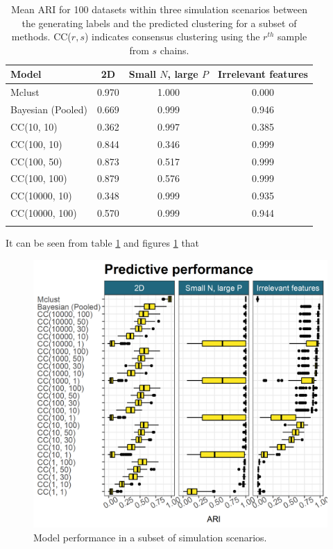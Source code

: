 \documentclass{bioinfo}
\begin{document}
\begin{table}[ht]
	\centering
	\caption{Mean ARI for 100 datasets within three simulation scenarios between the generating labels and the predicted clustering for a subset of methods. CC($r, s$) indicates consensus clustering using the $r^{th}$ sample from $s$ chains.}
	\begin{tabular}{l|ccc}
		\toprule
		\textbf{Model} & 2D & Small $N$, large $P$ & Irrelevant features \\
		\midrule
		Mclust & 0.970 &       1.000 &         0.000\\
		Bayesian (Pooled) &  0.669 & 				0.999 &         0.946\\
		CC(10, 10) & 0.362 &	            0.997 &         0.385\\
		CC(100, 10) & 0.844 &			    0.346 &         0.999\\
		CC(100, 50) & 0.873 &			    0.517 &         0.999\\
		CC(100, 100) & 0.879 &  			0.576 &         0.999\\
		CC(10000, 10) & 0.348 &             0.999 &			0.935\\
		CC(10000, 100) & 0.570 &            0.999 &			0.944\\
		\botrule
	\end{tabular}
	\label{table:meanARISims}
\end{table}
It can be seen from table \ref{table:meanARISims} and figures \ref{fig:simResults} that 

\begin{figure} %
	\centering
	\includegraphics[scale=0.5]{./Images/Simulations/simulation_model_prediction.png}
	\caption{Model performance in a subset of simulation scenarios. }
	\label{fig:simResults}
\end{figure}
\end{document}

